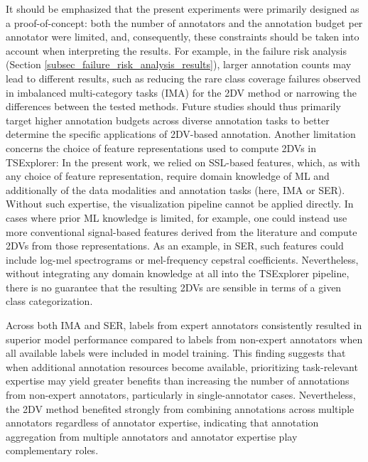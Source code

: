 \documentclass[a4paper,fleqn]{cas-dc}
\begin{document}
It should be emphasized that the present experiments were primarily designed as a proof-of-concept: both the number of annotators and the annotation budget per annotator were limited, and, consequently, these constraints should be taken into account when interpreting the results. For example, in the failure risk analysis (Section \ref{subsec_failure_risk_analysis_results}), larger annotation counts may lead to different results, such as reducing the rare class coverage failures observed in imbalanced multi-category tasks (IMA) for the 2DV method or narrowing the differences between the tested methods. Future studies should thus primarily target higher annotation budgets across diverse annotation tasks to better determine the specific applications of 2DV-based annotation. Another limitation concerns the choice of feature representations used to compute 2DVs in TSExplorer: In the present work, we relied on SSL-based features, which, as with any choice of feature representation, require domain knowledge of ML and additionally of the data modalities and annotation tasks (here, IMA or SER). Without such expertise, the visualization pipeline cannot be applied directly. In cases where prior ML knowledge is limited, for example, one could instead use more conventional signal-based features derived from the literature and compute 2DVs from those representations. As an example, in SER, such features could include log-mel spectrograms or mel-frequency cepstral coefficients. Nevertheless, without integrating any domain knowledge at all into the TSExplorer pipeline, there is no guarantee that the resulting 2DVs are sensible in terms of a given class categorization.

Across both IMA and SER, labels from expert annotators consistently resulted in superior model performance compared to labels from non-expert annotators when all available labels were included in model training. This finding suggests that when additional annotation resources become available, prioritizing task-relevant expertise may yield greater benefits than increasing the number of annotations from non-expert annotators, particularly in single-annotator cases. Nevertheless, the 2DV method benefited strongly from combining annotations across multiple annotators regardless of annotator expertise, indicating that annotation aggregation from multiple annotators and annotator expertise play complementary roles.
\end{document}
